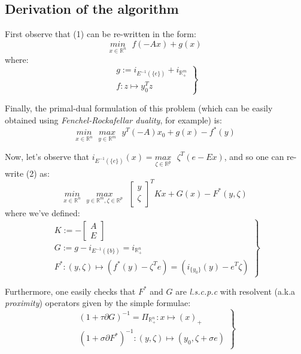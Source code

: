 \documentclass[a4paper,9pt,journal]{IEEEtran}
\begin{document}
\subsection{Derivation of the algorithm}
First observe that (1) can be re-written in the form:
\begin{equation}
  \underset{x \in \mathbb{R}^n}{min}\text{ }{f(-Ax) + g(x)}
\end{equation}
where:\\
\begin{equation}
  \left.
  \begin{aligned}
    g := i_{E^{-1}(\{e\})} + i_{\mathbb{R}_{+}^m}\\
    f: z \mapsto y_0^Tz
    \end{aligned}
  \right\}
\end{equation}

Finally, the primal-dual formulation of this problem (which can be easily obtained using
\textit{Fenchel-Rockafellar duality}, for example) is:
\begin{equation}
  \underset{x \in \mathbb{R}^n}{min}\text{ }\underset{y \in \mathbb{R}^m}{max}\text{ }{y^T(-A)x_0 + g(x) - f^*(y)}
\end{equation}

Now, let's observe that $i_{E^{-1}(\{e\})}(x) = \underset{\zeta \in \mathbb{R}^p}{max}\text{ }\zeta^T(e - Ex)$, and so one can re-write (2) as:
\begin{equation}
  \underset{x \in \mathbb{R}^n}{min}\text{ }\underset{y \in \mathbb{R}^m, \zeta \in \mathbb{R}^p}{max}\text{ }
  \begin{bmatrix}y\\\zeta\end{bmatrix}^TKx + G(x) - F^*(y, \zeta)
  \label{eq:pd_opt}
\end{equation}
where we've defined:
\begin{equation}
  \left.
  \begin{aligned}
    K := -\begin{bmatrix}A\\E\end{bmatrix}\\
    G := g - i_{E^{-1}(\{b\})} = i_{\mathbb{R}_{+}^n}\\
    F^*: (y, \zeta) \mapsto (f^*(y) - \zeta^Te) = (i_{\{y_0\}}(y) - e^T\zeta)
  \end{aligned}
  \right\}
\end{equation}

Furthermore, one easily checks that $F^*$ and $G$ are \textit{l.s.c.p.c} with resolvent
(a.k.a \textit{proximity}) operators given by the simple formulae:
\begin{equation}
  \left.
  \begin{aligned}
    (1 + \tau \partial G)^{-1} = \Pi_{\mathbb{R}_+^n}: x \mapsto (x)_+\\
    (1 + \sigma \partial F^*)^{-1}: (y, \zeta) \mapsto (y_0, \zeta + \sigma e)
  \end{aligned}
  \right\}
\end{equation}
\end{document}
